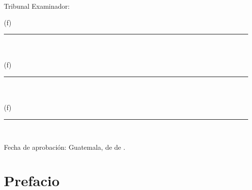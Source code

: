 \documentclass[11pt, letterpaper, twoside, openright]{report}
\newcommand{\defaultparformat}[1]{
	{\setlength{\parskip}{2ex}
     }
}
\begin{document}
	Tribunal Examinador:\\[1cm]
	\begin{center}
		(f) \rule[1pt]{4 in}{1pt}\\
		\nombreasesor \\[1in]
		(f) \rule[1pt]{4 in}{1pt}\\
		\nombreprimerex \\[1in]
		(f) \rule[1pt]{4 in}{1pt}\\
		\nombresegundoex
	\end{center}
	\vspace{1in}

    Fecha de aprobación: Guatemala, \diaaprobacion de \mesaprobacion de \anoaprobacion.
	\normalsize
\fi

\pagestyle{plain}
\ifdefined\CAPprefacio
	\newpage
	\cleardoublepage{}
    \chapter*{Prefacio}
    \ifdefined\parpordefecto
    	\defaultparformat{a-prefacio}
    \else
    	
    \fi
\fi

\ifdefined\CAPindice
	\newpage
    \cleardoublepage{}
	\renewcommand{\contentsname}{Índice}
    \pdfbookmark{\contentsname}{toc}
	\tableofcontents
\fi

\ifdefined\CAPfiguras
	\newpage
    \cleardoublepage{}
	\renewcommand{\listfigurename}{Lista de figuras}
	\listoffigures
\fi

\ifdefined\CAPcuadros
	\newpage
    \cleardoublepage{}
	\renewcommand{\listtablename}{Lista de cuadros}
	\listoftables
\fi
\end{document}
